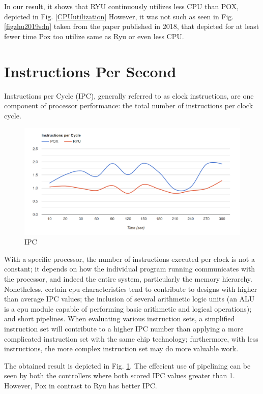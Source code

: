 In our result, it shows that RYU continuously utilizes less CPU than POX, depicted in Fig. \ref{CPUutilization} However, it was not such as seen in Fig. \ref{figzhu2019sdn} taken from the paper published in 2018, that depicted for at least fewer time Pox too utilize same as Ryu or even less CPU. \cite{zhu2019sdn}

\section{Instructions Per Second}

Instructions per Cycle (IPC), generally referred to as clock instructions, are one component of processor performance: the total number of instructions per clock cycle.

\begin{figure}[!hbt]
    \centering
        \includegraphics[width=\textwidth,keepaspectratio]{images/ipc.png}
       \caption{IPC}
        \label{ipc}
\end{figure}

With a specific processor, the number of instructions executed per clock is not a constant; it depends on how the individual program running communicates with the processor, and indeed the entire system, particularly the memory hierarchy. Nonetheless, certain cpu characteristics tend to contribute to designs with higher than average IPC values; the inclusion of several arithmetic logic units (an ALU is a cpu module capable of performing basic arithmetic and logical operations); and short pipelines. When evaluating various instruction sets, a simplified instruction set will contribute to a higher IPC number than applying a more complicated instruction set with the same chip technology; furthermore, with less instructions, the more complex instruction set may do more valuable work. 

The obtained result is depicted in Fig. \ref{ipc}. The effecient use of pipelining can be seen by both the controllers where both scored IPC values greater than 1. However, Pox in contrast to Ryu has better IPC.

